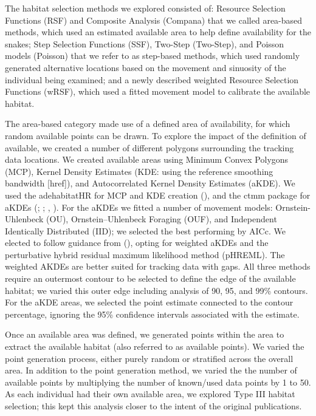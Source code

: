 \documentclass[10pt,a4paper]{article}
\begin{document}
The habitat selection methods we explored consisted of: Resource Selection Functions (RSF) and Composite Analysis (Compana) that we called area-based methods, which used an estimated available area to help define availability for the snakes; Step Selection Functions (SSF), Two-Step (Two-Step), and Poisson models (Poisson) that we refer to as step-based methods, which used randomly generated alternative locations based on the movement and sinuosity of the individual being examined; and a newly described weighted Resource Selection Functions (wRSF), which used a fitted movement model to calibrate the available habitat.

The area-based category made use of a defined area of availability, for which random available points can be drawn.
To explore the impact of the definition of available, we created a number of different polygons surrounding the tracking data locations.
We created available areas using Minimum Convex Polygons (MCP), Kernel Density Estimates (KDE: using the reference smoothing bandwidth {[}href{]}), and Autocorrelated Kernel Density Estimates (aKDE).
We used the adehabitatHR for MCP and KDE creation (), and the ctmm package for aKDEs (; ; , ).
For the aKDEs we fitted a number of movement models: Ornstein-Uhlenbeck (OU), Ornstein--Uhlenbeck Foraging (OUF), and Independent Identically Distributed (IID); we selected the best performing by AICc.
We elected to follow guidance from (), opting for weighted aKDEs and the perturbative hybrid residual maximum likelihood method (pHREML).
The weighted AKDEs are better suited for tracking data with gaps.
All three methods require an outermost contour to be selected to define the edge of the available habitat; we varied this outer edge including analysis of 90, 95, and 99\% contours.
For the aKDE areas, we selected the point estimate connected to the contour percentage, ignoring the 95\% confidence intervals associated with the estimate.

Once an available area was defined, we generated points within the area to extract the available habitat (also referred to as available points).
We varied the point generation process, either purely random or stratified across the overall area.
In addition to the point generation method, we varied the the number of available points by multiplying the number of known/used data points by 1 to 50.
As each individual had their own available area, we explored Type III habitat selection; this kept this analysis closer to the intent of the original publications.
\end{document}
